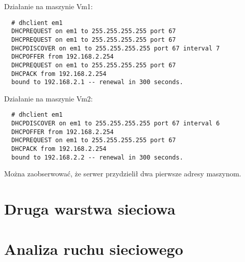 \documentclass{mwart} %
\begin{document}
\vspace{2mm}
Działanie na maszynie Vm1:
\begin{verbatim}
  # dhclient em1
  DHCPREQUEST on em1 to 255.255.255.255 port 67
  DHCPREQUEST on em1 to 255.255.255.255 port 67
  DHCPDISCOVER on em1 to 255.255.255.255 port 67 interval 7
  DHCPOFFER from 192.168.2.254
  DHCPREQUEST on em1 to 255.255.255.255 port 67
  DHCPACK from 192.168.2.254
  bound to 192.168.2.1 -- renewal in 300 seconds.
\end{verbatim}

Działanie na maszynie Vm2:
\begin{verbatim}
  # dhclient em1
  DHCPDISCOVER on em1 to 255.255.255.255 port 67 interval 6
  DHCPOFFER from 192.168.2.254
  DHCPREQUEST on em1 to 255.255.255.255 port 67
  DHCPACK from 192.168.2.254
  bound to 192.168.2.2 -- renewal in 300 seconds.
\end{verbatim}

Można zaobserwować, że serwer przydzielił dwa pierwsze adresy maszynom.
 
\section{Druga warstwa sieciowa}

\section{Analiza ruchu sieciowego}
\end{document}
